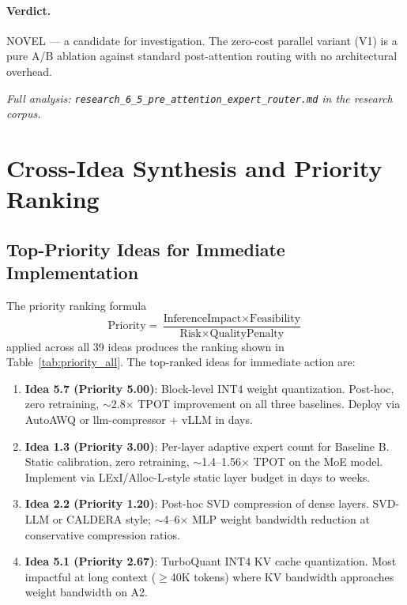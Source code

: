 \documentclass[11pt]{article}
\begin{document}
\paragraph{Verdict.} NOVEL --- a candidate for investigation. The zero-cost parallel variant (V1) is a pure A/B ablation against standard post-attention routing with no architectural overhead.

\par\noindent\textit{Full analysis: \texttt{research\_6\_5\_pre\_attention\_expert\_router.md} in the research corpus.}

\section{Cross-Idea Synthesis and Priority Ranking}
\label{sec:synthesis}

\subsection{Top-Priority Ideas for Immediate Implementation}

The priority ranking formula
\[
\text{Priority} = \frac{\text{InferenceImpact} \times \text{Feasibility}}{\text{Risk} \times \text{QualityPenalty}}
\]
applied across all 39 ideas produces the ranking shown in Table~\ref{tab:priority_all}. The top-ranked ideas for immediate action are:

\begin{enumerate}
    \item \textbf{Idea 5.7 (Priority 5.00)}: Block-level INT4 weight quantization. Post-hoc, zero retraining, $\sim$2.8$\times$ TPOT improvement on all three baselines. Deploy via AutoAWQ or llm-compressor + vLLM in days.
    \item \textbf{Idea 1.3 (Priority 3.00)}: Per-layer adaptive expert count for Baseline B. Static calibration, zero retraining, $\sim$1.4--1.56$\times$ TPOT on the MoE model. Implement via LExI/Alloc-L-style static layer budget in days to weeks.
    \item \textbf{Idea 2.2 (Priority 1.20)}: Post-hoc SVD compression of dense layers. SVD-LLM or CALDERA style; $\sim$4--6$\times$ MLP weight bandwidth reduction at conservative compression ratios.
    \item \textbf{Idea 5.1 (Priority 2.67)}: TurboQuant INT4 KV cache quantization. Most impactful at long context ($\geq$40K tokens) where KV bandwidth approaches weight bandwidth on A2.
\end{enumerate}
\end{document}
